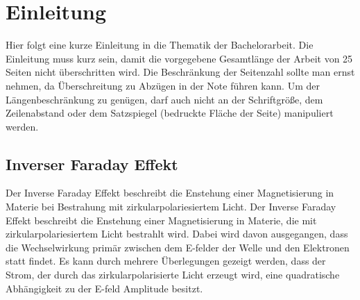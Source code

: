\chapter{Einleitung}
Hier folgt eine kurze Einleitung in die Thematik der Bachelorarbeit.
Die Einleitung muss kurz sein, damit die vorgegebene Gesamtlänge der
Arbeit von 25 Seiten nicht überschritten wird.
Die Beschränkung der Seitenzahl sollte man ernst nehmen,
da Überschreitung zu Abzügen in der Note führen kann.
Um der Längenbeschränkung zu genügen, darf auch nicht an der Schriftgröße,
dem Zeilenabstand oder dem Satzspiegel (bedruckte Fläche der Seite) manipuliert werden.





\section{Inverser Faraday Effekt}
Der Inverse Faraday Effekt beschreibt die Enstehung einer Magnetisierung in Materie bei Bestrahung mit zirkularpolariesiertem Licht.
Der Inverse Faraday Effekt beschreibt die Enstehung einer Magnetisierung in Materie, die mit zirkularpolariesiertem Licht bestrahlt wird.
Dabei wird davon ausgegangen, dass die Wechselwirkung primär zwischen dem E-felder der Welle und den Elektronen statt findet.
Es kann durch mehrere Überlegungen gezeigt werden, dass der Strom, der durch das zirkularpolarisierte Licht erzeugt wird, eine quadratische Abhängigkeit
zu der E-feld Amplitude besitzt.
